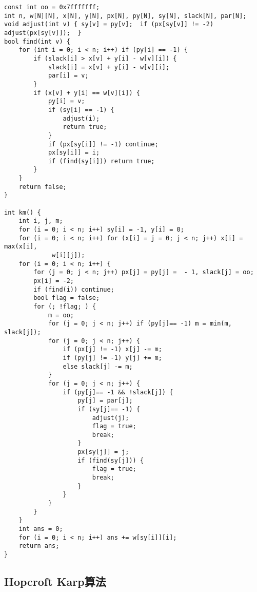 \documentclass{article}
\begin{document}
\begin{lstlisting}
const int oo = 0x7fffffff;
int n, w[N][N], x[N], y[N], px[N], py[N], sy[N], slack[N], par[N];
void adjust(int v) { sy[v] = py[v];  if (px[sy[v]] != -2) adjust(px[sy[v]]);  }
bool find(int v) {
    for (int i = 0; i < n; i++) if (py[i] == -1) {
        if (slack[i] > x[v] + y[i] - w[v][i]) {
            slack[i] = x[v] + y[i] - w[v][i];
            par[i] = v;
        }
        if (x[v] + y[i] == w[v][i]) {
            py[i] = v;
            if (sy[i] == -1) {
                adjust(i);
                return true;
            }
            if (px[sy[i]] != -1) continue;
            px[sy[i]] = i;
            if (find(sy[i])) return true;
        }
    }
    return false;
}

int km() {
    int i, j, m;
    for (i = 0; i < n; i++) sy[i] = -1, y[i] = 0;
    for (i = 0; i < n; i++) for (x[i] = j = 0; j < n; j++) x[i] = max(x[i],
             w[i][j]);
    for (i = 0; i < n; i++) {
        for (j = 0; j < n; j++) px[j] = py[j] =  - 1, slack[j] = oo;
        px[i] = -2;
        if (find(i)) continue;
        bool flag = false;
        for (; !flag; ) {
            m = oo;
            for (j = 0; j < n; j++) if (py[j]== -1) m = min(m, slack[j]);
            for (j = 0; j < n; j++) {
                if (px[j] != -1) x[j] -= m;
                if (py[j] != -1) y[j] += m;
                else slack[j] -= m;
            }
            for (j = 0; j < n; j++) {
                if (py[j]== -1 && !slack[j]) {
                    py[j] = par[j];
                    if (sy[j]== -1) {
                        adjust(j);
                        flag = true;
                        break;
                    }
                    px[sy[j]] = j;
                    if (find(sy[j])) {
                        flag = true;
                        break;
                    }
                }
            }
        }
    }
    int ans = 0;
    for (i = 0; i < n; i++) ans += w[sy[i]][i];
    return ans;
}
\end{lstlisting}

\subsection{Hopcroft Karp算法}
\end{document}
